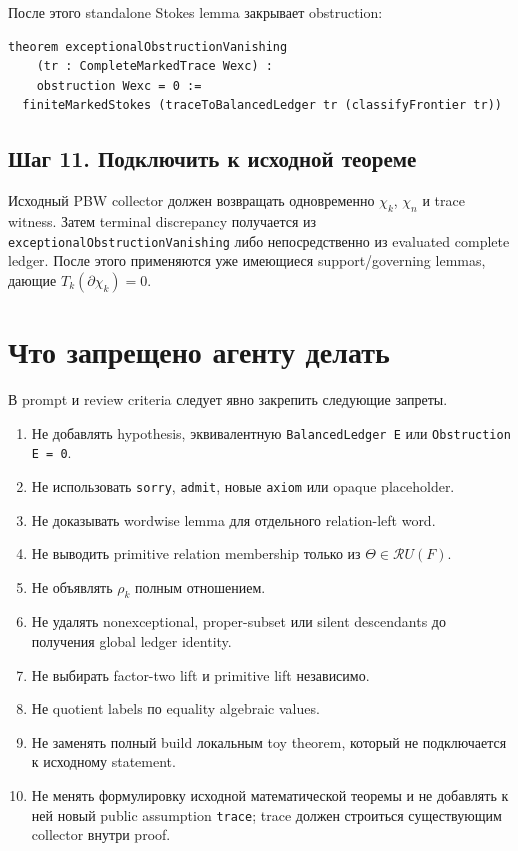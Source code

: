 \documentclass[11pt,a4paper]{article}
\theoremstyle{definition}
\theoremstyle{remark}
\newcommand{\Rel}{\mathcal R}
\begin{document}
После этого standalone Stokes lemma закрывает obstruction:

\begin{lstlisting}
theorem exceptionalObstructionVanishing
    (tr : CompleteMarkedTrace Wexc) :
    obstruction Wexc = 0 :=
  finiteMarkedStokes (traceToBalancedLedger tr (classifyFrontier tr))
\end{lstlisting}

\subsection{Шаг 11. Подключить к исходной теореме}

Исходный PBW collector должен возвращать одновременно $\chi_k$, $\chi_n$ и
trace witness. Затем terminal discrepancy получается из
\texttt{exceptionalObstructionVanishing} либо непосредственно из evaluated complete
ledger. После этого применяются уже имеющиеся support/governing lemmas,
дающие $T_k(\partial\chi_k)=0$.

\section{Что запрещено агенту делать}

В prompt и review criteria следует явно закрепить следующие запреты.

\begin{enumerate}
\item Не добавлять hypothesis, эквивалентную \texttt{BalancedLedger E} или
\texttt{Obstruction E = 0}.
\item Не использовать \texttt{sorry}, \texttt{admit}, новые \texttt{axiom} или opaque placeholder.
\item Не доказывать wordwise lemma для отдельного relation-left word.
\item Не выводить primitive relation membership только из
$\Theta\in\Rel U(F)$.
\item Не объявлять $\rho_k$ полным отношением.
\item Не удалять nonexceptional, proper-subset или silent descendants до
получения global ledger identity.
\item Не выбирать factor-two lift и primitive lift независимо.
\item Не quotient labels по equality algebraic values.
\item Не заменять полный build локальным toy theorem, который не подключается
к исходному statement.
\item Не менять формулировку исходной математической теоремы и не добавлять к
ней новый public assumption \texttt{trace}; trace должен строиться существующим
collector внутри proof.
\end{enumerate}
\end{document}
